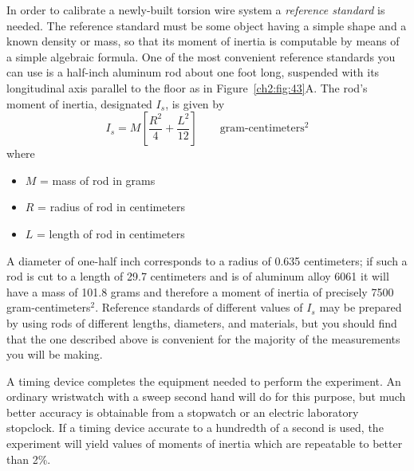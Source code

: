In order to calibrate a newly-built torsion wire system a \emph{reference
standard} is needed. The reference standard must be some object having a
simple shape and a known density or mass, so that its moment of inertia is
computable by means of a simple algebraic formula. One of the most convenient
reference standards you can use is a half-inch aluminum rod about one foot
long, suspended with its longitudinal axis parallel to the floor as in
Figure~\ref{ch2:fig:43}A. The rod's moment of inertia, designated $I_s$, is
given by
\begin{equation}\label{ch2:eq:110}
I_s = M\left[\frac{R^{2}}{4} + \frac{L^{2}}{12}\right] \qquad \text{gram-centimeters}^{2}
\end{equation}
where
\begin{itemize}[nosep,leftmargin=*,label={}]
  \item $M$ = mass of rod in grams
  \item $R$ = radius of rod in centimeters
  \item $L$ = length of rod in centimeters
\end{itemize}
A diameter of one-half inch corresponds to a radius of 0.635 centimeters; if
such a rod is cut to a length of 29.7 centimeters and is of aluminum alloy
6061 it will have a mass of 101.8 grams and therefore a moment of inertia of
precisely 7500 gram-centimeters$^{2}$. Reference standards of different values
of $I_s$ may be prepared by using rods of different lengths, diameters, and
materials, but you should find that the one described above is convenient for
the majority of the measurements you will be making.

A timing device completes the equipment needed to perform the experiment. An
ordinary wristwatch with a sweep second hand will do for this purpose, but
much better accuracy is obtainable from a stopwatch or an electric laboratory
stopclock. If a timing device accurate to a hundredth of a second is used, the
experiment will yield values of moments of inertia which are repeatable to
better than 2\%.

